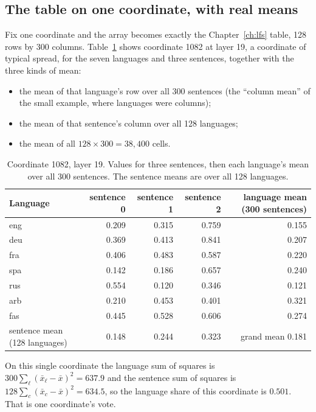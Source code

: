 \subsection{The table on one coordinate, with real means}

Fix one coordinate and the array becomes exactly the Chapter~\ref{ch:lfs}
table, 128 rows by 300 columns. Table~\ref{tab:onecoord} shows coordinate
1082 at layer 19, a coordinate of typical spread, for the seven languages and
three sentences, together with the three kinds of mean:

\begin{itemize}[leftmargin=1.6cm]
\item[language mean] the mean of that language's row over all 300 sentences
(the ``column mean'' of the small example, where languages were columns);
\item[sentence mean] the mean of that sentence's column over all 128
languages;
\item[grand mean] the mean of all $128 \times 300 = 38{,}400$ cells.
\end{itemize}

\begin{table}[h]\centering\small
\caption{Coordinate 1082, layer 19. Values for three sentences, then each language's mean over all 300 sentences. The sentence means are over all 128 languages.}
\label{tab:onecoord}
\begin{tabular}{lrrrr}
\toprule
Language & sentence 0 & sentence 1 & sentence 2 & language mean (300 sentences) \\
\midrule
eng & 0.209 & 0.315 & 0.759 & 0.155 \\
deu & 0.369 & 0.413 & 0.841 & 0.207 \\
fra & 0.406 & 0.483 & 0.587 & 0.220 \\
spa & 0.142 & 0.186 & 0.657 & 0.240 \\
rus & 0.554 & 0.120 & 0.346 & 0.121 \\
arb & 0.210 & 0.453 & 0.401 & 0.321 \\
fas & 0.445 & 0.528 & 0.606 & 0.274 \\
\midrule
sentence mean (128 languages) & 0.148 & 0.244 & 0.323 & grand mean 0.181 \\
\bottomrule
\end{tabular}
\end{table}

On this single coordinate the language sum of squares is
$300 \sum_\ell (\bar x_\ell - \bar x)^2 = 637.9$ and the sentence sum of
squares is $128 \sum_c (\bar x_c - \bar x)^2 = 634.5$, so the language share
of this coordinate is $0.501$. That is one coordinate's vote.

